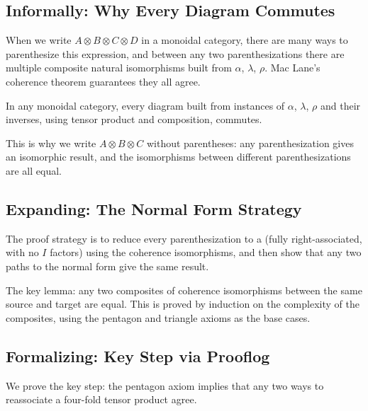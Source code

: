 \subsection{Informally: Why Every Diagram Commutes}

When we write $A \otimes B \otimes C \otimes D$ in a monoidal category, there
are many ways to parenthesize this expression, and between any two
parenthesizations there are multiple composite natural isomorphisms built from
$\alpha$, $\lambda$, $\rho$. Mac Lane's coherence theorem guarantees they all
agree.

\begin{theorem}
\label{thm:maclane-coherence}
In any monoidal category, every diagram built from instances of $\alpha$,
$\lambda$, $\rho$ and their inverses, using tensor product and composition,
commutes.
\end{theorem}

This is why we write $A \otimes B \otimes C$ without parentheses: any
parenthesization gives an isomorphic result, and the isomorphisms between
different parenthesizations are all equal.

\subsection{Expanding: The Normal Form Strategy}

The proof strategy is to reduce every parenthesization to a 
(fully right-associated, with no $I$ factors) using the coherence isomorphisms,
and then show that any two paths to the normal form give the same result.

The key lemma: any two composites of coherence isomorphisms between the same
source and target are equal. This is proved by induction on the complexity of
the composites, using the pentagon and triangle axioms as the base cases.

\subsection{Formalizing: Key Step via Prooflog}

We prove the key step: the pentagon axiom implies that any two ways to
reassociate a four-fold tensor product agree.


